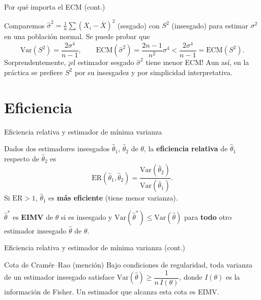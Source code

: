 \documentclass[aspectratio=169,11pt]{beamer}
\begin{document}
\begin{frame}{Por qué importa el ECM (cont.)}
\begin{example}
Comparemos $\widehat\sigma^2 = \frac{1}{n}\sum(X_i-\overline X)^2$ (sesgado) con $S^2$ (insesgado) para estimar $\sigma^2$ en una población normal. Se puede probar que
\[
\mathrm{Var}(S^2) = \frac{2\sigma^4}{n-1}, \qquad \mathrm{ECM}(\widehat\sigma^2) = \frac{2n-1}{n^2}\sigma^4 < \frac{2\sigma^4}{n-1} = \mathrm{ECM}(S^2).
\]
Sorprendentemente, ¡el estimador sesgado $\widehat\sigma^2$ tiene menor ECM! Aun así, en la práctica se prefiere $S^2$ por su insesgadez y por simplicidad interpretativa.
\end{example}
\end{frame}

\section{Eficiencia}

\begin{frame}{Eficiencia relativa y estimador de mínima varianza}
\begin{definition}
Dados dos estimadores insesgados $\widehat\theta_1$, $\widehat\theta_2$ de $\theta$, la \textbf{eficiencia relativa} de $\widehat\theta_1$ respecto de $\widehat\theta_2$ es
\[
\mathrm{ER}(\widehat\theta_1,\widehat\theta_2) = \frac{\mathrm{Var}(\widehat\theta_2)}{\mathrm{Var}(\widehat\theta_1)}.
\]
Si $\mathrm{ER} > 1$, $\widehat\theta_1$ es \textbf{más eficiente} (tiene menor varianza).
\end{definition}

\begin{definition}
$\widehat\theta^*$ es \textbf{EIMV} de $\theta$ si es insesgado y $\mathrm{Var}(\widehat\theta^*) \le \mathrm{Var}(\widehat\theta)$ para \textbf{todo} otro estimador insesgado $\widehat\theta$ de $\theta$.
\end{definition}

\end{frame}

\begin{frame}{Eficiencia relativa y estimador de mínima varianza (cont.)}
\begin{alertblock}{Cota de Cramér--Rao (mención)}
Bajo condiciones de regularidad, toda varianza de un estimador insesgado satisface
$\mathrm{Var}(\widehat\theta) \ge \dfrac{1}{n\, I(\theta)}$, donde $I(\theta)$ es la información de Fisher. Un estimador que alcanza esta cota es EIMV.
\end{alertblock}
\end{frame}
\end{document}

